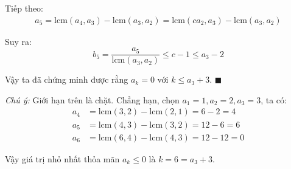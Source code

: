 \documentclass[../01-divisibility.tex]{subfiles}
\begin{document}
\begin{soln}
	Tiếp theo:
	\begin{align*}
		a_5 = \text{lcm}(a_4, a_3) - \text{lcm}(a_3, a_2) = \text{lcm}(c a_2, a_3) - \text{lcm}(a_3, a_2)
	\end{align*}

	Suy ra:
	\[
		b_5 = \frac{a_5}{\text{lcm}(a_3, a_2)} \leq c - 1 \leq a_3 - 2
	\]
	
	Vậy ta đã chứng minh được rằng \( a_k = 0 \) với \( k \leq a_3 + 3 \). \hfill \( \blacksquare \)
	
	\textit{Chú ý:} Giới hạn trên là chặt.
	Chẳng hạn, chọn \( a_1 = 1, a_2 = 2, a_3 = 3 \), ta có:
	\begin{align*}
		a_4 &= \text{lcm}(3,2) - \text{lcm}(2,1) = 6 - 2 = 4 \\
		a_5 &= \text{lcm}(4,3) - \text{lcm}(3,2) = 12 - 6 = 6 \\
		a_6 &= \text{lcm}(6,4) - \text{lcm}(4,3) = 12 - 12 = 0
	\end{align*}
	
	Vậy giá trị nhỏ nhất thỏa mãn \( a_k \leq 0 \) là \( k = 6 = a_3 + 3 \).
\end{soln}

\end{document}

